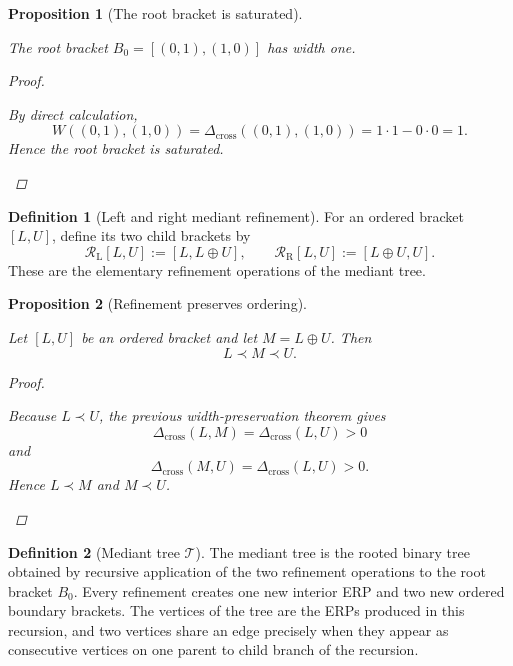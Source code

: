 \documentclass[11pt, letterpaper]{article}
\newcommand{\med}{\oplus}
\newcommand{\Dcross}{\Delta_{\mathrm{cross}}}
\theoremstyle{definition}
\newtheorem{definition}{Definition}[section]
\theoremstyle{plain}
\newtheorem{proposition}{Proposition}[section]
\begin{document}
\begin{proposition}[The root bracket is saturated]
\begin{rsbox}
The root bracket $B_0=[(0,1),(1,0)]$ has width one.
\end{rsbox}
\begin{proof}
\begin{rsbox}
By direct calculation,
\[
W((0,1),(1,0))=\Dcross((0,1),(1,0))=1\cdot 1-0\cdot 0=1.
\]
Hence the root bracket is saturated.
\end{rsbox}
\end{proof}

\end{proposition}

\begin{definition}[Left and right mediant refinement]
For an ordered bracket $[L,U]$, define its two child brackets by
\[
\mathcal{R}_{\mathrm{L}}[L,U]:=[L,L\med U],
\qquad
\mathcal{R}_{\mathrm{R}}[L,U]:=[L\med U,U].
\]
These are the elementary refinement operations of the mediant tree.
\end{definition}

\begin{proposition}[Refinement preserves ordering]
\begin{rsbox}
Let $[L,U]$ be an ordered bracket and let $M=L\med U$.  Then
\[
L\prec M\prec U.
\]
\end{rsbox}
\begin{proof}
\begin{rsbox}
Because $L\prec U$, the previous width-preservation theorem gives
\[
\Dcross(L,M)=\Dcross(L,U)>0
\]
and
\[
\Dcross(M,U)=\Dcross(L,U)>0.
\]
Hence $L\prec M$ and $M\prec U$.
\end{rsbox}
\end{proof}

\end{proposition}

\begin{definition}[Mediant tree $\mathcal{T}$]
The mediant tree is the rooted binary tree obtained by recursive application of
the two refinement operations to the root bracket $B_0$.  Every refinement
creates one new interior ERP and two new ordered boundary brackets.  The
vertices of the tree are the ERPs produced in this recursion, and two vertices
share an edge precisely when they appear as consecutive vertices on one parent
to child branch of the recursion.
\end{definition}
\end{document}
